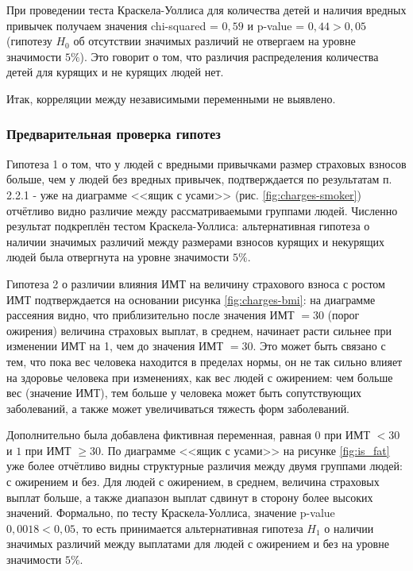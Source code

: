 \documentclass[a4paper,12pt]{article}
\begin{document}
При проведении теста Краскела-Уоллиса для количества детей и наличия вредных привычек получаем значения chi-squared = $0,59$ и p-value = $0,44 > 0,05$ (гипотезу $H_0$ об отсутствии значимых различий не отвергаем на уровне значимости $5\%$). Это говорит о том, что различия распределения количества детей для курящих и не курящих людей нет.

Итак, корреляции между независимыми переменными не выявлено.

\subsubsection{Предварительная проверка гипотез}

Гипотеза 1 о том, что у людей с вредными привычками размер страховых взносов больше, чем у людей без вредных привычек, подтверждается по результатам п. 2.2.1 - уже на диаграмме <<ящик с усами>> (рис. \ref{fig:charges-smoker}) отчётливо видно различие между рассматриваемыми группами людей. Численно результат подкреплён тестом Краскела-Уоллиса: альтернативная гипотеза о наличии значимых различий между размерами взносов курящих и некурящих людей была отвергнута на уровне значимости $5\%$.

Гипотеза 2 о различии влияния ИМТ на величину страхового взноса с ростом ИМТ подтверждается на основании рисунка \ref{fig:charges-bmi}: на диаграмме рассеяния видно, что приблизительно после значения ИМТ $= 30$ (порог ожирения) величина страховых выплат, в среднем, начинает расти сильнее при изменении ИМТ на 1, чем до значения ИМТ $= 30$. Это может быть связано с тем, что пока вес человека находится в пределах нормы, он не так сильно влияет на здоровье человека при изменениях, как вес людей с ожирением: чем больше вес (значение ИМТ), тем больше у человека может быть сопутствующих заболеваний, а также может увеличиваться тяжесть форм заболеваний.

Дополнительно была добавлена фиктивная переменная, равная $0$ при ИМТ $<30$ и $1$ при ИМТ $\ge30$. По диаграмме <<ящик с усами>> на рисунке \ref{fig:is_fat} уже более отчётливо видны структурные различия между двумя группами людей: с ожирением и без. Для людей с ожирением, в среднем, величина страховых выплат больше, а также диапазон выплат сдвинут в сторону более высоких значений. Формально, по тесту Краскела-Уоллиса, значение p-value $0,0018 < 0,05$, то есть принимается альтернативная гипотеза $H_1$ о наличии значимых различий между выплатами для людей с ожирением и без на уровне значимости $5\%.$
\end{document}
